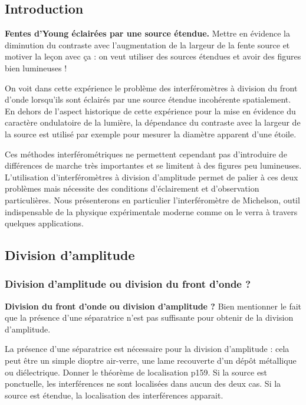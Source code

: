 \subsection*{Introduction}

\begin{experience}
\textbf{Fentes d'Young éclairées par une source étendue.}
Mettre en évidence la diminution du contraste avec l'augmentation de la largeur de la fente source et motiver la leçon avec ça : on veut utiliser des sources étendues et avoir des figures bien lumineuses !
\end{experience}

On voit dans cette expérience le problème des interféromètres à division du front d'onde lorsqu'ils sont éclairés par une source étendue incohérente spatialement.
En dehors de l'aspect historique de cette expérience pour la mise en évidence du caractère ondulatoire de la lumière, la dépendance du contraste avec la largeur de la source est utilisé par exemple pour mesurer la diamètre apparent d'une étoile.

Ces méthodes interférométriques ne permettent cependant pas d'introduire de différences de marche très importantes et se limitent à des figures peu lumineuses.
L'utilisation d'interféromètres à division d'amplitude permet de palier à ces deux problèmes mais nécessite des conditions d'éclairement et d'observation particulières.
Nous présenterons en particulier l'interféromètre de Michelson, outil indispensable de la physique expérimentale moderne comme on le verra à travers quelques applications.

\subsection{Division d'amplitude}

\subsubsection{Division d'amplitude ou division du front d'onde ?}

\begin{slide}
\textbf{Division du front d'onde ou division d'amplitude ?}
Bien mentionner le fait que la présence d'une séparatrice n'est pas suffisante pour obtenir de la division d'amplitude.
\end{slide}

La présence d'une séparatrice est nécessaire pour la division d'amplitude : cela peut être un simple dioptre air-verre, une lame recouverte d'un dépôt métallique ou diélectrique.
Donner le théorème de localisation \cite{Mauras2001} p159.
Si la source est ponctuelle, les interférences ne sont localisées dans aucun des deux cas.
Si la source est étendue, la localisation des interférences apparait.

